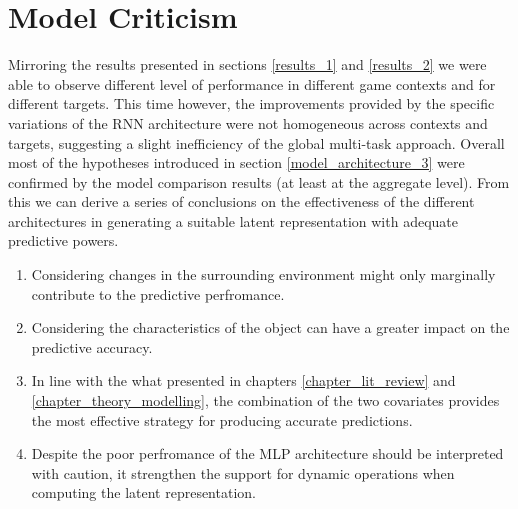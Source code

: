 \section{Model Criticism}
\label{model_criticism_3}
Mirroring the results presented in sections \ref{results_1} and \ref{results_2} we were able to observe different level of performance in different game contexts and for different targets. This time however, the improvements provided by the specific variations of the RNN architecture were not homogeneous across contexts and targets, suggesting a slight inefficiency of the global multi-task  approach. Overall most of the hypotheses introduced in section \ref{model_architecture_3} were confirmed by the model comparison results (at least at the aggregate level). From this we can derive a series of conclusions on the effectiveness of the different architectures in generating a suitable latent representation with adequate predictive powers.
\begin{enumerate}
    \item Considering changes in the surrounding environment might only marginally contribute to the predictive perfromance.
    \item Considering the characteristics of the object can have a greater impact on the predictive accuracy.
    \item In line with the what presented in chapters \ref{chapter_lit_review} and \ref{chapter_theory_modelling}, the combination of the two covariates provides the most effective strategy for producing accurate predictions.
    \item Despite the poor perfromance of the MLP architecture should be interpreted with caution, it strengthen the support for dynamic operations when computing the latent representation.
\end{enumerate}
